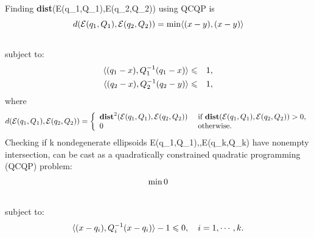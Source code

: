 \documentclass[letterpaper,10pt,english]{sphinxmanual}
\begin{document}
Finding {\bf dist}({\mathcal E}(q_1,Q_1),{\mathcal E}(q_2,Q_2))
using QCQP is
\begin{gather}
\begin{split}d({\mathcal E}(q_1,Q_1),{\mathcal E}(q_2,Q_2)) = \min \langle (x-y), (x-y)\rangle\end{split}\notag\\\begin{split}\end{split}\notag
\end{gather}
subject to:
\begin{gather}
\begin{split}\begin{aligned}
\langle (q_1-x), Q_1^{-1}(q_1-x)\rangle & \leqslant& 1,\\
\langle (q_2-x), Q_2^{-1}(q_2-y)\rangle & \leqslant& 1,\end{aligned}\end{split}\notag
\end{gather}
where
\begin{gather}
\begin{split}d({\mathcal E}(q_1,Q_1),{\mathcal E}(q_2,Q_2))=\left\{\begin{array}{ll}
{\bf dist}^2({\mathcal E}(q_1,Q_1),{\mathcal E}(q_2,Q_2)) &
\mbox{ if } {\bf dist}({\mathcal E}(q_1,Q_1),{\mathcal E}(q_2,Q_2))>0, \\
0 & \mbox{ otherwise}. \end{array}\right.\end{split}\notag
\end{gather}
Checking if k nondegenerate ellipsoids
{\mathcal E}(q_1,Q_1),\cdots,{\mathcal E}(q_k,Q_k) have nonempty
intersection, can be cast as a quadratically constrained quadratic
programming (QCQP) problem:
\begin{gather}
\begin{split}\min 0\end{split}\notag\\\begin{split}\end{split}\notag
\end{gather}
subject to:
\begin{gather}
\begin{split}\langle (x-q_i),Q_i^{-1}(x-q_i)\rangle - 1 \leqslant0, ~~~ i=1,\cdots,k.\end{split}\notag\\\begin{split}\end{split}\notag
\end{gather}
\end{document}
